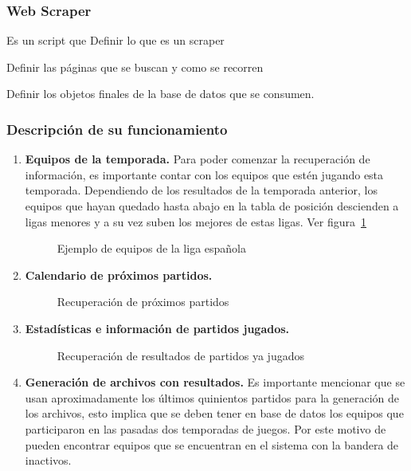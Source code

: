 \subsubsection{Web Scraper}
Es un script que 
\cite{hogue2005thresher}
Definir lo que es un scraper

Definir las páginas que se buscan y como se recorren

Definir los objetos finales de la base de datos que se consumen.




\subsubsection{Descripción de su funcionamiento}

\begin{enumerate}
	\item \textbf{Equipos de la temporada.}
	Para poder comenzar la recuperación de información, es importante contar con los equipos que estén jugando esta temporada. Dependiendo de los resultados de la temporada anterior, los equipos que hayan quedado hasta abajo en la tabla de posición descienden a ligas menores y a su vez suben los mejores de estas ligas. Ver figura~\ref{Fig:los-equipos}
	\begin{figure}[!htb]\centering
	   \begin {minipage}{1\textwidth}
	     \caption[Ejemplo de equipos de la liga española]{Ejemplo de equipos de la liga española\footnotemark }\label{Fig:los-equipos}
	   \end{minipage}
	\end{figure}

	
	\item \textbf{Calendario de próximos partidos.}
	\begin{figure}[!htb]\centering
	   \begin {minipage}{1\textwidth}
	     \caption{Recuperación de próximos partidos}\label{Fig:proximos-partidos}
	   \end{minipage}
	\end{figure}
	
	\item \textbf{Estadísticas e información de partidos jugados.}
	\begin{figure}[!htb]\centering
	   \begin {minipage}{1\textwidth}
	     \caption{Recuperación de resultados de partidos ya jugados}\label{Fig:pasados-partidos}
	   \end{minipage}
	\end{figure}
	\item \textbf{Generación de archivos con resultados.}
	Es importante mencionar que se usan aproximadamente los últimos quinientos partidos para la generación de los archivos, esto implica que se deben tener en base de datos los equipos que participaron en las pasadas dos temporadas de juegos. Por este motivo de pueden encontrar equipos que se encuentran en el sistema con la bandera de inactivos.
	

\end{enumerate}
